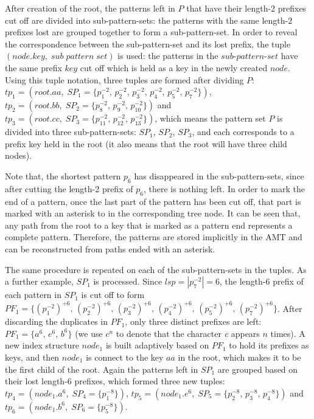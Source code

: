 \documentclass[legalpaper]{article}
\begin{document}
After creation of the root, the patterns left in $P$ that have their
length-2 prefixes cut off are divided into sub-pattern-sets: the
patterns with the same length-2 prefixes lost are grouped together to
form a sub-pattern-set. In order to reveal the correspondence between
the sub-pattern-set and its lost prefix, the tuple $(node.key,\;
sub\;pattern\;set)$ is used: the patterns in the $sub$-$pattern$-$set$
have the same prefix $key$ cut off which is held as a key in the newly
created $node$. Using this tuple notation, three tuples are formed
after dividing $P$: $tp_1 = (root.aa,\; SP_1=\{p_1^{-2},\, p_2^{-2},\,
p_3^{-2},\, p_4^{-2},\, p_5^{-2},\, p_7^{-2}\})$,\, $tp_2 =
(root.bb,\; SP_2=\{p_8^{-2},\, p_9^{-2},\, p_{10}^{-2}\})$ and $tp_3 =
(root.cc,\; SP_3=\{p_{11}^{-2},\, p_{12}^{-2},\, p_{13}^{-2}\})$,
which means the pattern set $P$ is divided into three
sub-pattern-sets: $SP_1$, $SP_2$, $SP_3$, and each corresponds to a
prefix key held in the root (it also means that the root will have
three child nodes).

Note that, the shortest pattern $p_6$ has disappeared in the
sub-pattern-sets, since after cutting the length-2 prefix of $p_6$,
there is nothing left. In order to mark the end of a pattern, once the
last part of the pattern has been cut off, that part is marked with an
asterisk to in the corresponding tree node. It can be seen that, any
path from the root to a key that is marked as a pattern end represents
a complete pattern. Therefore, the patterns are stored implicitly in
the \textsf{AMT} and can be reconstructed from paths ended with an
asterisk.

The same procedure is repeated on each of the sub-pattern-sets in the
tuples. As a further example, $SP_1$ is processed. Since $lsp =
|p_7^{-2}| = 6$, the length-$6$ prefix of each pattern in $SP_1$ is
cut off to form \(PF_1 = \{(p_1^{-2})^{+6},\, (p_2^{-2})^{+6},\,
(p_3^{-2})^{+6},\, (p_4^{-2})^{+6},\, (p_5^{-2})^{+6},\,
(p_7^{-2})^{+6}\}\). After discarding the duplicates in $PF_1$, only
three distinct prefixes are left: $PF_1 = \{a^6,\, e^6,\, b^6\}$ (we
use $c^n$ to denote that the character \emph{c} appears $n$ times).  A
new index structure $node_1$ is built adaptively based on $PF_1$ to
hold its prefixes as keys, and then $node_1$ is connect to the key
$aa$ in the root, which makes it to be the first child of the
root. Again the patterns left in $SP_1$ are grouped based on their
lost length-6 prefixes, which formed three new tuples: $tp_4 =
(node_1.a^6,\; SP_4=\{p_1^{-8}\})$, $tp_5 = (node_1.e^6,\;
SP_5=\{p_2^{-8},\, p_3^{-8},\, p_4^{-8}\})$ and $tp_6 = (node_1.b^6,\;
SP_6=\{p_5^{-8}\})$.
\end{document}
